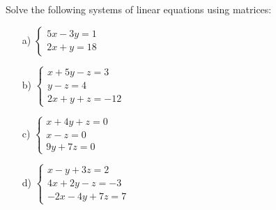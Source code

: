\begin{problem}%
    Solve the following systems of linear equations using matrices:

    \begin{enumerate}
        \item[a) ] $\begin{cases}
            5x-3y=1\\
            2x+y=18
        \end{cases}$
        
        \item[b) ] $\begin{cases}
            x+5y-z=3\\
            y-z=4\\
            2x+y+z=-12
        \end{cases}$
        
        \item[c) ] $\begin{cases}
            x+4y+z=0\\
            x-z=0\\
            9y+7z=0
        \end{cases}$
        
        \item[d) ] $\begin{cases}
            x-y+3z=2\\
            4x+2y-z=-3\\
            -2x-4y+7z=7
        \end{cases}$
        
    \end{enumerate}
\end{problem}
\bigskip



        
        
